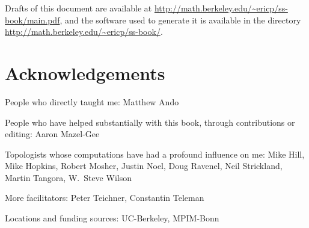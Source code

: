 Drafts of this document are available at \url{http://math.berkeley.edu/\~ericp/ss-book/main.pdf}, and the software used to generate it is available in the directory \url{http://math.berkeley.edu/\~ericp/ss-book/}.

\section{Acknowledgements}

People who directly taught me: Matthew Ando

People who have helped substantially with this book, through contributions or editing: Aaron Mazel-Gee %

Topologists whose computations have had a profound influence on me: Mike Hill, Mike Hopkins, Robert Mosher, Justin Noel, Doug Ravenel, Neil Strickland, Martin Tangora, W.\ Steve Wilson

More facilitators: Peter Teichner, Constantin Teleman

Locations and funding sources: UC-Berkeley, MPIM-Bonn
